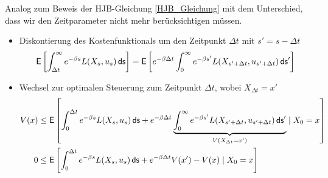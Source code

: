 \documentclass[a4paper, 12pt]{scrartcl}
\newcommand{\ds}{\thinspace \mathsf{ds}}
\begin{document}
\begin{beweis}
    Analog zum Beweis der HJB-Gleichung \ref{HJB_Gleichung} 
    mit dem Unterschied, dass wir den Zeitparameter 
    nicht mehr berücksichtigen müssen.
    \begin{itemize}
        \item [1.] Diskontierung des Kostenfunktionals um den Zeitpunkt $\Delta t$ mit
        $s' = s - \Delta t$
        \begin{align*}
            \mathsf{E}
            \left[
                \int_{\Delta t}^{\infty} e^{-\beta s} L(X_s,u_s) \ds 
            \right]
            =
            \mathsf{E}
            \left[
                e^{-\beta \Delta t}
                \int_{0}^{\infty} e^{-\beta s'} L(X_{s' + \Delta t},u_{s' + \Delta t}) \ds'
            \right]
        \end{align*}

        \item[2.] Wechsel zur optimalen Steuerung zum Zeitpunkt $\Delta t$, 
        wobei $X_{\Delta t} = x'$
        \begin{align*}
            V(x) &\leq 
            \mathsf{E}
            \left[
                \int_{0}^{\Delta t} e^{-\beta s} L(X_s,u_s) \ds 
                + 
                e^{-\beta \Delta t} 
                \underbrace{
                    \int_{0}^{\infty} e^{-\beta s'} L(X_{s' + \Delta t},u_{s' + \Delta t}) \ds' 
                }_{V(X_{\Delta t} = x')}
                \mid X_0 = x
            \right]
            \\
            0 &\leq 
            \mathsf{E}
            \left[
                \int_{0}^{\Delta t} e^{-\beta s} L(X_s,u_s) \ds 
                + 
                e^{-\beta \Delta t} V(x') - V(x)
                \mid X_0 = x
            \right]
        \end{align*}


\end{itemize}
\end{beweis}
\end{document}

